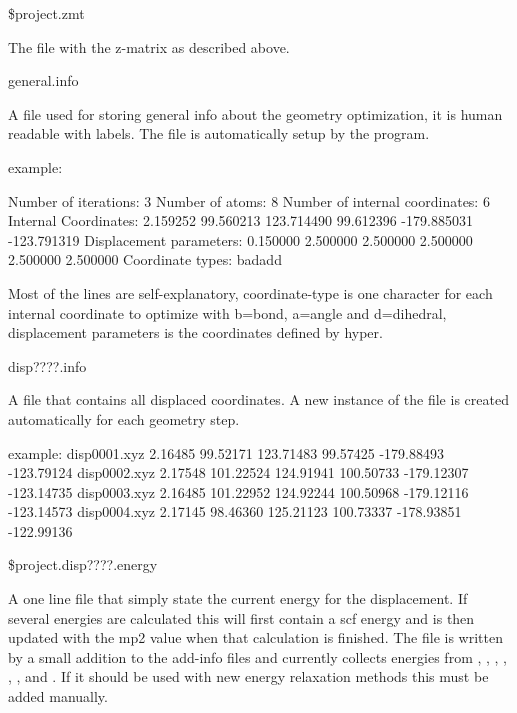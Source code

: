 \begin{filelist}

\item[\$project.zmt]

The file with the z-matrix as described above.

\item[general.info]

A file used for storing general info about the geometry optimization, it is human readable with labels.
 The file is automatically setup by the program.

example:
\begin{sourcelisting}
Number of iterations:              3
Number of atoms:                   8
Number of internal coordinates:    6
Internal Coordinates:
    2.159252   99.560213  123.714490   99.612396 -179.885031 -123.791319
Displacement parameters:
    0.150000    2.500000    2.500000    2.500000    2.500000    2.500000
Coordinate types:
badadd   
\end{sourcelisting}
Most of the lines are self-explanatory, coordinate-type is one character for each
 internal coordinate to optimize with b=bond, a=angle and d=dihedral, displacement
 parameters is the coordinates defined by hyper.

\item[disp????.info]

A file that contains all displaced coordinates. A new instance of the file is created automatically for each geometry step.
\begin{sourcelisting}
example:
disp0001.xyz 2.16485  99.52171 123.71483  99.57425 -179.88493 -123.79124
disp0002.xyz 2.17548 101.22524 124.91941 100.50733 -179.12307 -123.14735
disp0003.xyz 2.16485 101.22952 124.92244 100.50968 -179.12116 -123.14573
disp0004.xyz 2.17145  98.46360 125.21123 100.73337 -178.93851 -122.99136
\end{sourcelisting}

\item[\$project.disp????.energy]

A one line file that simply state the current energy for the displacement.
 If several energies are calculated this will first contain a scf energy
 and is then updated with the mp2 value when that calculation is finished.
 The file is written by a small addition to the add-info files and currently
 collects energies from , , , , 
, , and . If
 it should be used with new energy relaxation methods this must be added manually.


\end{filelist}
